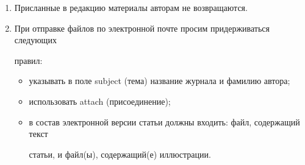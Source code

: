 {{\begin{enumerate}[1.]
{GOST 8.586.5-2005. 2007. Metodika vypolneniya izmereniy. Izmerenie raskhoda i~ko\-li\-che\-st\-va zhidkostey i gazov s


pomoshch'yu standartnykh suzhayushchikh ustroystv [Method of measurement.


Measurement of flow rate and volume of liquids and gases by means of orifice devices]. Moscow:


Standardinform  Publs. 10~p.





\noindent


\textbf{Описание патента:}





.


2006. Sposob orientirovaniya po krenu letatel'nogo


apparata s opti\-che\-skoy golovkoy


samonavedeniya [The way to orient on the roll of aircraft with optical homing head].


Patent RF No.\,2280590.


}





\item Присланные в редакцию материалы авторам не возвращаются.\\[-13.5pt]





\item При отправке файлов по электронной почте просим придерживаться следующих


правил:


\begin{itemize}


\item указывать в поле subject (тема) название журнала и фамилию автора;\\[-12pt]


\item использовать attach (присоединение);\\[-12pt]


\item в состав электронной версии статьи должны входить: файл, содержащий текст


статьи, и файл(ы), содержащий(е) иллюстрации.\\[-12pt]



\end{itemize}
\end{enumerate}}}

